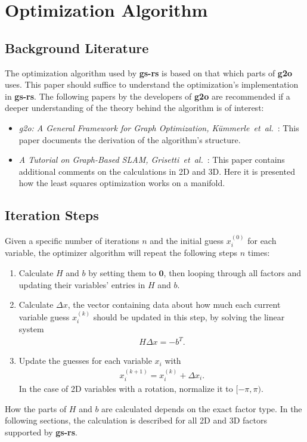 \section{Optimization Algorithm}

\subsection{Background Literature}

The optimization algorithm used by \textbf{gs-rs} is based on that which parts of \textbf{g2o} uses. This paper should suffice to understand the optimization's implementation in \textbf{gs-rs}. The following papers by the developers of \textbf{g2o} are recommended if a deeper understanding of the theory behind the algorithm is of interest:
\begin{itemize}
	\item \textit{g2o: A General Framework for Graph Optimization, Kümmerle~et~al.}~\cite{kummerle2011g2o}: This paper documents the derivation of the algorithm's structure.
	\item \textit{A Tutorial on Graph-Based SLAM, Grisetti~et~al.}~\cite{grisetti2010tutorial}: This paper contains additional comments on the calculations in 2D and 3D. Here it is presented how the least squares optimization works on a manifold.
\end{itemize}

\subsection{Iteration Steps}

Given a specific number of iterations $n$ and the initial guess $x_i^{(0)}$ for each variable, the optimizer algorithm will repeat the following steps $n$ times:
\begin{enumerate}
	\item Calculate $H$ and $b$ by setting them to $\boldsymbol{0}$, then looping through all factors and updating their variables' entries in $H$ and $b$.
	\item Calculate $\Delta x$, the vector containing data about how much each current variable guess $x_i^{(k)}$ should be updated in this step, by solving the linear system
		\begin{align}
			H \Delta x = -b^T.
		\end{align}
	\item Update the guesses for each variable $x_i$ with
		\begin{align}
			x_i^{(k+1)} = x_i^{(k)} + \Delta x_i.
		\end{align}
		In the case of 2D variables with a rotation, normalize it to $[-\pi, \pi)$.
\end{enumerate}
How the parts of $H$ and $b$ are calculated depends on the exact factor type. In the following sections, the calculation is described for all 2D and 3D factors supported by \textbf{gs-rs}.